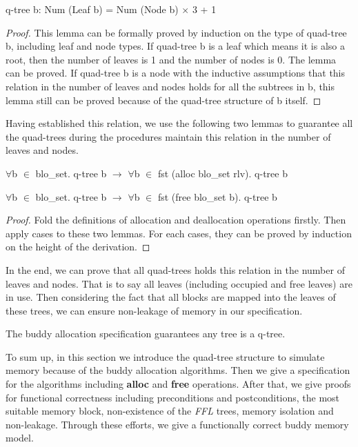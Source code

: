 \begin{lemma}
	q-tree b: Num (Leaf b) = Num (Node b) $\times$ 3 + 1
\end{lemma}

\begin{proof}
	This lemma can be formally proved by induction on the type of quad-tree b, including leaf and node types. If quad-tree b is a leaf which means it is also a root, then the number of leaves is 1 and the number of nodes is 0. The lemma can be proved. If quad-tree b is a node with the inductive assumptions that this relation in the number of leaves and nodes holds for all the subtrees in b, this lemma still can be proved because of the quad-tree structure of b itself.
\end{proof}

Having established this relation, we use the following two lemmas to guarantee all the quad-trees during the procedures maintain this relation in the number of leaves and nodes.

\begin{lemma}
	$\forall$b $\in$ blo\_set. q-tree b $\longrightarrow$ $\forall$b $\in$ fst (alloc blo\_set rlv). q-tree b
\end{lemma}

\begin{lemma}
	$\forall$b $\in$ blo\_set. q-tree b $\longrightarrow$ $\forall$b $\in$ fst (free blo\_set b). q-tree b
\end{lemma}

\begin{proof}
	Fold the definitions of allocation and deallocation operations firstly. Then apply cases to these two lemmas. For each cases, they can be proved by induction on the height of the derivation.
\end{proof}

In the end, we can prove that all quad-trees holds this relation in the number of leaves and nodes. That is to say all leaves (including occupied and free leaves) are in use. Then considering the fact that all blocks are mapped into the leaves of these trees, we can ensure non-leakage of memory in our specification.

\begin{theorem}
	The buddy allocation specification guarantees any tree is a q-tree.
\end{theorem}

To sum up, in this section we introduce the quad-tree structure to simulate memory because of the buddy allocation algorithms. Then we give a specification for the algorithms including \textbf{alloc} and \textbf{free} operations. After that, we give proofs for functional correctness including preconditions and postconditions, the most suitable memory block, non-existence of the \emph{FFL} trees, memory isolation and non-leakage. Through these efforts, we give a functionally correct buddy memory model.